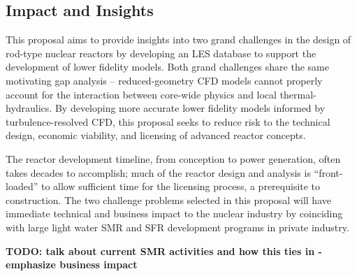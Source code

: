\documentclass[11pt,letterpaper,english]{article}
\begin{document}


\vspace{-.25in}
\subsection{Impact and Insights}
\vspace{-.2in}

This proposal aims to provide insights into two grand challenges in the design of rod-type nuclear reactors by developing an LES database to support the development of lower fidelity models. Both grand challenges share the same motivating gap analysis -- reduced-geometry CFD models cannot properly account for the interaction between core-wide physics and local thermal-hydraulics. By developing more accurate lower fidelity models informed by turbulence-resolved CFD, this proposal seeks to reduce risk to the technical design, economic viability, and licensing of advanced reactor concepts. 

The reactor development timeline, from conception to power generation, often takes decades to accomplish; much of the reactor design and analysis is ``front-loaded'' to allow sufficient time for the licensing process, a prerequisite to construction. The two challenge problems selected in this proposal will have immediate technical and business impact to the nuclear industry by coinciding with large light water SMR and SFR development programs in private industry.

{\bf TODO: talk about current SMR activities and how this ties in - emphasize business impact}
\end{document}

